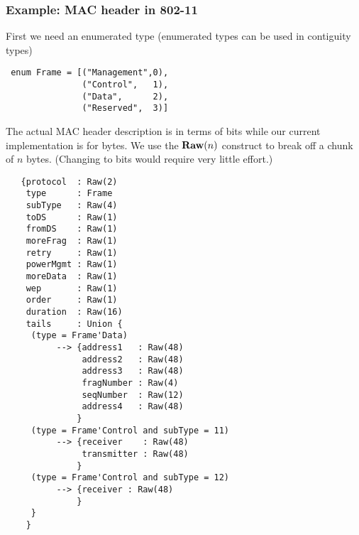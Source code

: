 \documentclass{beamer}
\newcommand{\konst}[1]{\ensuremath{\mbox{\bf{#1}}}}
\begin{document}
\begin{frame}\frametitle{Example: MAC header in 802-11}

First we need an enumerated type (enumerated
types can be used in contiguity types)

\begin{verbatim}
 enum Frame = [("Management",0),
               ("Control",   1),
               ("Data",      2),
               ("Reserved",  3)]
\end{verbatim}

\vspace*{5mm}

The actual MAC header description is in terms of bits while our
current implementation is for bytes. We use the $\konst{Raw}(n)$
construct to break off a chunk of $n$ bytes. (Changing to bits would
require very little effort.)


\begin{verbatim}
   {protocol  : Raw(2)
    type      : Frame
    subType   : Raw(4)
    toDS      : Raw(1)
    fromDS    : Raw(1)
    moreFrag  : Raw(1)
    retry     : Raw(1)
    powerMgmt : Raw(1)
    moreData  : Raw(1)
    wep       : Raw(1)
    order     : Raw(1)
    duration  : Raw(16)
    tails     : Union {
     (type = Frame'Data)
          --> {address1   : Raw(48)
               address2   : Raw(48)
               address3   : Raw(48)
               fragNumber : Raw(4)
               seqNumber  : Raw(12)
               address4   : Raw(48)
              }
     (type = Frame'Control and subType = 11)
          --> {receiver    : Raw(48)
               transmitter : Raw(48)
              }
     (type = Frame'Control and subType = 12)
          --> {receiver : Raw(48)
              }
     }
    }
\end{verbatim}

\end{frame}
\end{document}
